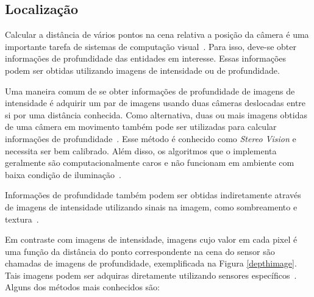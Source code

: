 \subsection{Localização}
\label{sec:luz-estruturada}

	Calcular a distância de vários pontos na cena relativa a posição da câmera é uma
	importante tarefa de sistemas de computação visual~\cite{jain}. Para isso,
	deve-se obter informações de profundidade das entidades em interesse. Essas
	informações podem ser obtidas utilizando imagens de intensidade ou de
	profundidade.
	
	Uma maneira comum de se obter informações de profundidade de imagens de
	intensidade é adquirir um par de imagens usando duas câmeras deslocadas entre si
	por uma distância conhecida. Como alternativa, duas ou mais imagens obtidas de
	uma câmera em movimento também pode ser utilizadas para calcular informações de
	profundidade~\cite{jain}. Esse método é conhecido como \textit{Stereo Vision} e
	necessita ser bem calibrado.  Além disso, os algoritmos que o implementa
	geralmente são computacionalmente caros e não funcionam em ambiente com baixa
	condição de iluminação~\cite{fall-detection}.
	
	Informações de profundidade também podem ser obtidas indiretamente através de
	imagens de intensidade utilizando sinais na imagem, como sombreamento e
	textura~\cite{jain}.
	
	Em contraste com imagens de intensidade, imagens cujo valor em cada pixel é uma
	função da distância do ponto correspondente na cena do sensor são chamadas de
	imagens de profundidade, exemplificada na Figura \ref{depthimage}. Tais imagens
	podem ser adquiras diretamente utilizando sensores específicos~\cite{jain}.
	Alguns dos métodos mais conhecidos são:

